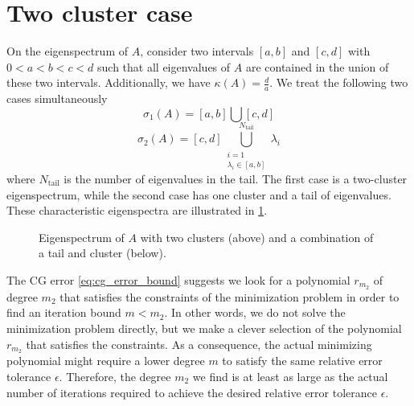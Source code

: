 \section{Two cluster case}\label{sec:cg_sharpened_convrate}
On the eigenspectrum of $A$, consider two intervals $[a, b]$ and $[c, d]$ with $0 < a < b < c < d$ such that all eigenvalues of $A$ are contained in the union of these two intervals. Additionally, we have $\kappa(A) = \frac{d}{a}$. We treat the following two cases simultaneously
\begin{equation}
    \sigma_1(A) = [a,b] \bigcup [c,d]
    \label{eq:two_clusters}
\end{equation}
\begin{equation}
    \sigma_2(A) = [c,d] \bigcup_{\substack{i=1 \\ \lambda_i \in [a,b]}}^{N_{\text{tail}}} \lambda_i
    \label{eq:one_cluster_with_tail}
\end{equation}
where $N_{\text{tail}}$ is the number of eigenvalues in the tail. The first case is a two-cluster eigenspectrum, while the second case has one cluster and a tail of eigenvalues. These characteristic eigenspectra are illustrated in \cref{fig:eigenvalue_clusters}.
\begin{figure}[H]
    \centering
    
    \caption{Eigenspectrum of $A$ with two clusters (above) and a combination of a tail and cluster (below).}
    \label{fig:eigenvalue_clusters}
\end{figure}

The CG error \cref{eq:cg_error_bound} suggests we look for a polynomial $r_{m_2}$ of degree $m_2$ that satisfies the constraints of the minimization problem in order to find an iteration bound $m < m_2$. In other words, we do not solve the minimization problem directly, but we make a clever selection of the polynomial $r_{m_2}$ that satisfies the constraints. As a consequence, the actual minimizing polynomial might require a lower degree $m$ to satisfy the same relative error tolerance $\epsilon$. Therefore, the degree $m_2$ we find is at least as large as the actual number of iterations required to achieve the desired relative error tolerance $\epsilon$.

